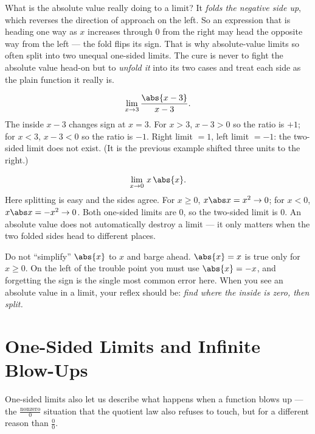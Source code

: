 \begin{happeningbox}
What is the absolute value really doing to a limit? It \emph{folds the negative
side up}, which reverses the direction of approach on the left. So an
expression that is heading one way as $x$ increases through $0$ from the right
may head the opposite way from the left --- the fold flips its sign. That is
why absolute-value limits so often split into two unequal one-sided limits.
The cure is never to fight the absolute value head-on but to \emph{unfold it}
into its two cases and treat each side as the plain function it really is.
\end{happeningbox}

\begin{example}
\label{ch07:ex-abs-shift}
\[
  \lim_{x\to 3}\frac{\abs{x-3}}{x-3}.
\]
The inside $x-3$ changes sign at $x=3$. For $x>3$, $x-3>0$ so the ratio is
$+1$; for $x<3$, $x-3<0$ so the ratio is $-1$. Right limit $=1$, left limit
$=-1$: the two-sided limit does not exist. (It is the previous example shifted
three units to the right.)
\end{example}

\begin{example}
\label{ch07:ex-abs-ok}
\[
  \lim_{x\to 0}\, x\,\abs{x}.
\]
Here splitting is easy and the sides agree. For $x\ge 0$, $x\abs x = x^2 \to 0$;
for $x<0$, $x\abs x = -x^2 \to 0$. Both one-sided limits are $0$, so the
two-sided limit is $0$. An absolute value does not automatically destroy a
limit --- it only matters when the two folded sides head to different places.
\end{example}

\begin{trapbox}
Do not ``simplify'' $\abs{x}$ to $x$ and barge ahead. $\abs{x} = x$ is true
only for $x\ge 0$. On the left of the trouble point you must use $\abs{x}=-x$,
and forgetting the sign is the single most common error here. When you see an
absolute value in a limit, your reflex should be: \emph{find where the inside
is zero, then split.}
\end{trapbox}

\section{One-Sided Limits and Infinite Blow-Ups}
\label{ch07:infinite}

One-sided limits also let us describe what happens when a function blows up ---
the $\frac{\text{nonzero}}{0}$ situation that the quotient law also refuses to
touch, but for a different reason than $\frac00$.

